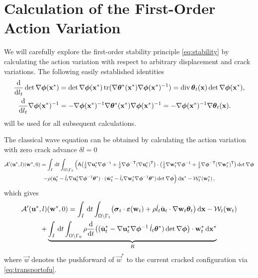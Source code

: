\section{Calculation of the First-Order Action Variation} \label{sec:calactionvariation}
We will carefully explore the first-order stability principle \eqref{eq:stability} by calculating the action variation with respect to arbitrary displacement and crack variations. The following easily established identities
\begin{align*}
\frac{\md}{\md l_t}\det\nabla\philt(\vec{x}^*) &= \det\nabla\philt(\vec{x}^*)\tr(\nabla\vtheta^*(\vec{x}^*)\nabla\philt(\vec{x}^*)^{-1})=\div\vtheta_t(\vec{x})\det\nabla\philt(\vec{x}^*), \\
\frac{\md}{\md l_t}\nabla\philt(\vec{x}^*)^{-1} &= -\nabla\philt(\vec{x}^*)^{-1}\nabla\vtheta^*(\vec{x}^*)\nabla\philt(\vec{x}^*)^{-1}=-\nabla\philt(\vec{x}^*)^{-1}\nabla\vtheta_t(\vec{x}).
\end{align*}
will be used for all subsequent calculations.

The classical wave equation can be obtained by calculating the action variation with zero crack advance $\delta l=0$
\begin{multline*}
\mathcal{A}'(\vec{u}^*,l)(\vec{w}^*,0)=\int_I\D{t}\int_\domaini\Big(\tens{A}\bigl({\textstyle\frac{1}{2}}\nabla\vec{u}_t^*\nabla\philt^{-1}+{\textstyle\frac{1}{2}}\nabla\philt^{-\mathsf{T}}(\nabla\vec{u}_t^*)^\mT\bigr)\cdot\bigl({\textstyle\frac{1}{2}}\nabla\vec{w}_t^*\nabla\philt^{-1}+{\textstyle\frac{1}{2}}\nabla\philt^{-\mathsf{T}}(\nabla\vec{w}_t^*)^\mT\bigr)\det\nabla\philt \\
-\rho(\dot{\vec{u}}_t^*-\dot{l}_t\nabla\vec{u}_t^*\nabla\philt^{-1}\vtheta^*)\cdot(\dot{\vec{w}}_t^*-\dot{l}_t\nabla\vec{w}_t^*\nabla\philt^{-1}\vtheta^*)\det\nabla\philt\Big)\dxx-\mathcal{W}_t^*(\vec{w}^*_t)\,,
\end{multline*}
which gives
\begin{multline} \label{eq:aprime1}
\mathcal{A}'(\vec{u}^*,l)(\vec{w}^*,0)=\int_I\D{t}\int_\domaint\bigl(\sig_t\cdot\eps(\vec{w}_t)+\rho\dot{l}_t\dot{\vec{u}}_t\cdot\nabla\vec{w}_t\vtheta_t\bigr)\dx-\mathcal{W}_t(\vec{w}_t) \\
+\underbrace{\int_I\D{t}\int_\domaini\rho\frac{\md}{\md t}\bigl((\dot{\vec{u}}_t^*-\nabla\vec{u}_t^*\nabla\philt^{-1}\,\dot{l}_t\vtheta^*)\det\nabla\philt\bigr)\cdot\vec{w}_t^*\dxx}_R
\end{multline}
where $\vec{w}$ denotes the pushforward of $\vec{w}^*$ to the current cracked configuration via \eqref{eq:transportofu}.

